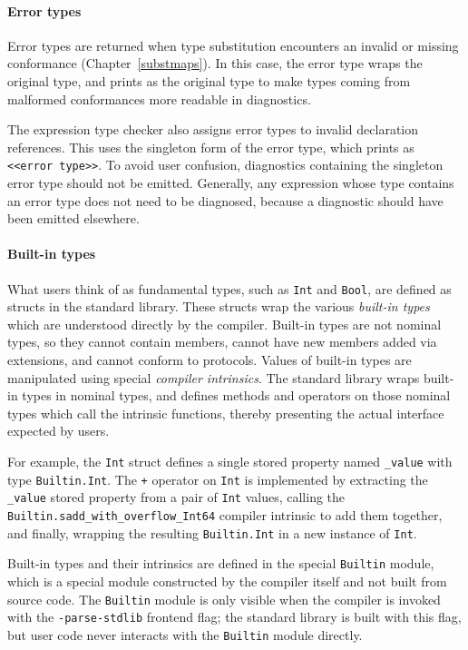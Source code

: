 \documentclass[../generics]{subfiles}
\begin{document}
\paragraph{Error types}
Error types are returned when type substitution encounters an invalid or missing conformance (Chapter~\ref{substmaps}). In this case, the error type wraps the original type, and prints as the original type to make types coming from malformed conformances more readable in diagnostics.

The expression type checker also assigns error types to invalid declaration references. This uses the singleton form of the error type, which prints as \texttt{<<error~type>>}. To avoid user confusion, diagnostics containing the singleton error type should not be emitted. Generally, any expression whose type contains an error type does not need to be diagnosed, because a diagnostic should have been emitted elsewhere.

\paragraph{Built-in types}
What users think of as fundamental types, such as \texttt{Int} and \texttt{Bool}, are defined as structs in the standard library. These structs wrap the various \emph{built-in types} which are understood directly by the compiler. Built-in types are not nominal types, so they cannot contain members, cannot have new members added via extensions, and cannot conform to protocols. Values of built-in types are manipulated using special \emph{compiler intrinsics}. The standard library wraps built-in types in nominal types, and defines methods and operators on those nominal types which call the intrinsic functions, thereby presenting the actual interface expected by users.

For example, the \texttt{Int} struct defines a single stored property named \texttt{\_value} with type \texttt{Builtin.Int}. The \texttt{+} operator on \texttt{Int} is implemented by extracting the \texttt{\_value} stored property from a pair of \texttt{Int} values, calling the \texttt{Builtin.sadd\_with\_overflow\_Int64} compiler intrinsic to add them together, and finally, wrapping the resulting \texttt{Builtin.Int} in a new instance of \texttt{Int}.

Built-in types and their intrinsics are defined in the special \texttt{Builtin} module, which is a special module constructed by the compiler itself and not built from source code. The \texttt{Builtin} module is only visible when the compiler is invoked with the \texttt{-parse-stdlib} frontend flag; the standard library is built with this flag, but user code never interacts with the \texttt{Builtin} module directly.
\end{document}
